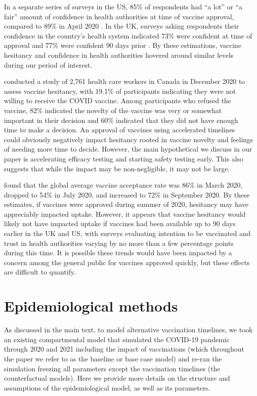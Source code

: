 \documentclass{article}
\begin{document}
In a separate series of surveys in the US, 85\% of respondents had ``a lot'' or ``a fair'' amount of confidence in health authorities at time of vaccine approval, compared to 89\% in April 2020 \citep{Kennedy2022Americans}. In the UK, surveys asking respondents their confidence in the country's health system indicated 73\% were confident at time of approval and 77\% were confident 90 days prior \citep{YouGov2023Confidence}. By these estimations, vaccine hesitancy and confidence in health authorities hovered around similar levels during our period of interest.

\citet{Dzieciolowska2021COVID} conducted a study of 2,761 health care workers in Canada in December 2020 to assess vaccine hesitancy, with 19.1\% of participants indicating they were not willing to receive the COVID vaccine. Among participants who refused the vaccine, 82\% indicated the novelty of the vaccine was very or somewhat important in their decision and 60\% indicated that they did not have enough time to make a decision. An approval of vaccines using accelerated timelines could obviously negatively impact hesitancy rooted in vaccine novelty and feelings of needing more time to decide. However, the main hypothetical we discuss in our paper is accelerating efficacy testing and starting safety testing early. This also suggests that while the impact may be non-negligible, it may not be large.

\citet{Joshi2021Predictors} found that the global average vaccine acceptance rate was 86\% in March 2020, dropped to 54\% in July 2020, and increased to 72\% in September 2020. By these estimates, if vaccines were approved during summer of 2020, hesitancy may have appreciably impacted uptake. However, it appears that vaccine hesitancy would likely not have impacted uptake if vaccines had been available up to 90 days earlier in the UK and US, with surveys evaluating intention to be vaccinated and trust in health authorities varying by no more than a few percentage points during this time. It is possible these trends would have been impacted by a concern among the general public for vaccines approved quickly, but these effects are difficult to quantify.

\section{Epidemiological methods}\label{epidemiological-methods}

As discussed in the main text, to model alternative vaccination timelines, we took an existing compartmental model that simulated the COVID-19 pandemic through 2020 and 2021 including the impact of vaccinations (which throughout the paper we refer to as the baseline or base case model) and re-ran the simulation freezing all parameters except the vaccination timelines (the counterfactual models). Here we provide more details on the structure and assumptions of the epidemiological model, as well as its parameters.
\end{document}
